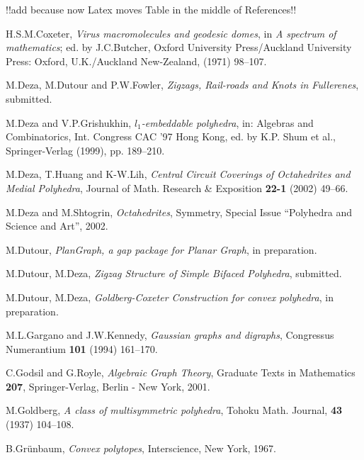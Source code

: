 \documentclass[12pt]{article}
\begin{document}
!!add \newpage
because now Latex moves Table in the middle of References!!


\begin{thebibliography}{99}



H.S.M.Coxeter, {\em Virus macromolecules and geodesic domes}, in {\em A spectrum of mathematics}; ed. by J.C.Butcher, Oxford University Press/Auckland University Press: Oxford, U.K./Auckland New-Zealand, (1971) 98--107.


M.Deza, M.Dutour and P.W.Fowler,
{\em Zigzags, Rail-roads and Knots in Fullerenes},
submitted.


M.Deza and V.P.Grishukhin,
{\em $l_1$-embeddable polyhedra},
in: Algebras and Combinatorics, Int. Congress CAC '97 Hong Kong,
ed. by K.P. Shum et al., Springer-Verlag (1999), pp. 189--210.


M.Deza, T.Huang and K-W.Lih,
{\em Central Circuit Coverings of Octahedrites and Medial Polyhedra},
Journal of Math. Research \& Exposition {\bf 22-1} (2002) 49--66.


M.Deza and M.Shtogrin,
{\em Octahedrites}, 
Symmetry, Special Issue ``Polyhedra and Science and Art'', 2002.


M.Dutour, {\em PlanGraph, a gap package for Planar Graph}, in preparation.


M.Dutour, M.Deza, {\em Zigzag Structure of Simple Bifaced Polyhedra}, submitted.


M.Dutour, M.Deza, {\em Goldberg-Coxeter Construction for convex polyhedra}, in preparation.


M.L.Gargano and J.W.Kennedy,
{\em Gaussian graphs and digraphs}, Congressus Numerantium {\bf 101}
(1994) 161--170.


C.Godsil and G.Royle, {\em Algebraic Graph Theory}, Graduate Texts in 
Mathematics {\bf 207}, Springer-Verlag, Berlin - New York, 2001.


M.Goldberg, {\em A class of multisymmetric polyhedra}, Tohoku Math.
Journal, {\bf 43} (1937) 104--108.


B.Gr\"{u}nbaum, {\em Convex polytopes}, Interscience, New York, 1967.



\end{thebibliography}
\end{document}
